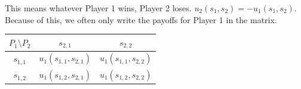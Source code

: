 \documentclass[12pt, a4paper]{article}
\begin{document}
This means whatever Player 1 wins, Player 2 loses. $u_2(s_1, s_2) = -u_1(s_1, s_2)$.
Because of this, we often only write the payoffs for Player 1 in the matrix.

\begin{center}
\renewcommand{\arraystretch}{1.5}
\begin{tabular}{|c|c|c|}
  \hline
  $P_1 \setminus P_2$ & $s_{2,1}$ & $s_{2,2}$ \\
  \hline
  $s_{1,1}$ & $u_1(s_{1,1}, s_{2,1})$ & $u_1(s_{1,1}, s_{2,2})$ \\
  \hline
  $s_{1,2}$ & $u_1(s_{1,2}, s_{2,1})$ & $u_1(s_{1,2}, s_{2,2})$ \\
  \hline
\end{tabular}
\end{center}
\end{document}
